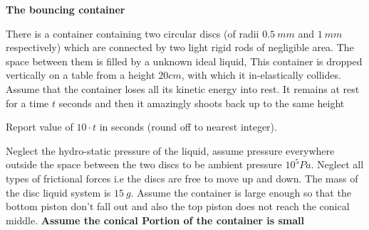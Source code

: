 \documentclass[11pt,a4paper]{scrartcl}
\begin{document}
\begin{problem}
\begin{center}
    \textbf{The bouncing container}
\end{center}

There is a container containing two circular discs (of radii $0.5\ mm$ and $1\ mm$ respectively) which are connected by two light rigid rods of negligible area. The space between them is filled by a unknown ideal liquid, This container is dropped vertically on a table from a height $20 cm$, with which it in-elastically collides. Assume that the container loses all its kinetic energy into rest. It remains at rest for a time $t$ seconds and then it amazingly shoots back up to the same height 

Report value of $\boxed{10\cdot t}$ in seconds (round off to nearest integer).\newline

Neglect the hydro-static pressure of the liquid, assume pressure everywhere outside the space between the two discs to be ambient pressure $10^5 Pa$. Neglect all types of frictional forces i.e the discs are free to move up and down. The mass of the disc liquid system is $15\ g$. Assume the container is large enough so that the bottom piston don't fall out and also  the top piston does not reach the conical middle. \textbf{Assume the conical Portion of the container is small}

\begin{center}
    


\begin{tikzpicture}[x=0.75pt,y=0.75pt,yscale=-1,xscale=1]


\end{tikzpicture}
\end{center}
\end{problem}
\end{document}
